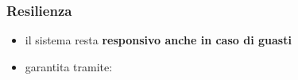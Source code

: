\begin{frame}[c]{\insertsectionhead}{\insertsubsectionhead}
\begin{columns}
\begin{column}{.47\textwidth}
                    \subsubsection{Resilienza}\label{subsub:resiliency}
                    \begin{block}{\insertsubsubsectionhead}
                        \begin{itemize}
                            \item
                                il sistema resta \textbf{responsivo anche in caso di guasti}
                            \item
                                garantita tramite:
                        \end{itemize}
                    \end{block}
                \end{column}
            \end{columns}
        \end{frame}

